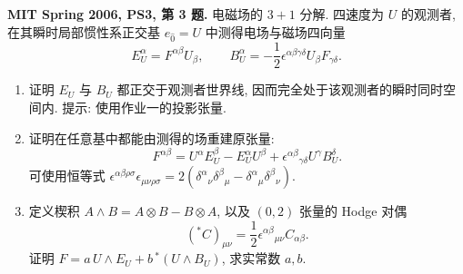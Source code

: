 \begin{exercise}
\textbf{MIT Spring 2006, PS3, 第 3 题.} 电磁场的 $3+1$ 分解. 四速度为 $U$ 的观测者, 在其瞬时局部惯性系正交基 $e_{\hat0}=U$ 中测得电场与磁场四向量
\[
 E_U^\alpha=F^{\alpha\beta}U_\beta,\qquad
 B_U^\alpha=-\frac12\epsilon^{\alpha\beta\gamma\delta}U_\beta F_{\gamma\delta}.
\]
\begin{enumerate}[label=(\alph*)]
\item 证明 $E_U$ 与 $B_U$ 都正交于观测者世界线, 因而完全处于该观测者的瞬时同时空间内. 提示: 使用作业一的投影张量.
\item 证明在任意基中都能由测得的场重建原张量:
\[
 F^{\alpha\beta}=U^\alpha E_U^\beta-E_U^\alpha U^\beta
 +\epsilon^{\alpha\beta}{}_{\gamma\delta}U^\gamma B_U^\delta.
\]
可使用恒等式 $\epsilon^{\alpha\beta\rho\sigma}\epsilon_{\mu\nu\rho\sigma}=2(\delta^\alpha{}_{\nu}\delta^\beta{}_{\mu}-\delta^\alpha{}_{\mu}\delta^\beta{}_{\nu})$.
\item 定义楔积 $A\wedge B=A\otimes B-B\otimes A$, 以及 $(0,2)$ 张量的 Hodge 对偶
\[
 ({}^*C)_{\mu\nu}=\frac12\epsilon^{\alpha\beta}{}_{\mu\nu}C_{\alpha\beta}.
\]
证明 $F=a\,U\wedge E_U+b\,{}^*(U\wedge B_U)$, 求实常数 $a,b$.
\end{enumerate}
\end{exercise}
